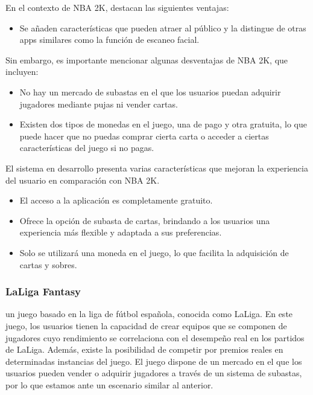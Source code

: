 En el contexto de NBA 2K, destacan las siguientes ventajas:
\begin{itemize}
    \item Se añaden características que pueden atraer al público y la distingue de otras apps similares como la función de escaneo facial.
\end{itemize}

Sin embargo, es importante mencionar algunas desventajas de NBA 2K, que incluyen:
\begin{itemize}
    \item No hay un mercado de subastas en el que los usuarios puedan adquirir jugadores mediante pujas ni vender cartas.
    \item Existen dos tipos de monedas en el juego, una de pago y otra gratuita, lo que puede hacer que no puedas comprar cierta carta o acceder a ciertas características del juego si no pagas.
\end{itemize}

El sistema en desarrollo presenta varias características que mejoran la experiencia del usuario en comparación con NBA 2K.
\begin{itemize}
    \item El acceso a la aplicación es completamente gratuito.
    \item Ofrece la opción de subasta de cartas, brindando a los usuarios una experiencia más flexible y adaptada a sus preferencias.
    \item Solo se utilizará una moneda en el juego, lo que facilita la adquisición de cartas y sobres.
\end{itemize}

\subsubsection{LaLiga Fantasy}
 un juego basado en la liga de fútbol española, conocida como LaLiga. En este juego, los usuarios tienen la capacidad de crear equipos que se componen de jugadores cuyo rendimiento se correlaciona con el desempeño real en los partidos de LaLiga. Además, existe la posibilidad de competir por premios reales en determinadas instancias del juego.
El juego dispone de un mercado en el que los usuarios pueden vender o adquirir jugadores a través de un sistema de subastas, por lo que estamos ante un escenario similar al anterior.

